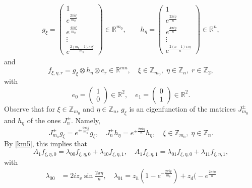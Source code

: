 \documentclass[12pt,reqno]{amsart}
\numberwithin{equation}{section}
\newcommand{\R}{{\mathbb R}}
\newcommand{\Z}{{\mathbb Z}}
\newcommand{\la}{\lambda}
\begin{document}
\begin{appendix}
\begin{equation}
\begin{aligned}
g_{\xi}=
\begin{pmatrix}
1  \\
e^{\frac{2\pi i \xi}{m_0}} \\
e^{\frac{4\pi i \xi}{m_0}} \\
\vdots \\
e^{\frac{2(m_0-1)\pi i \xi}{m_0}} 
\end{pmatrix}\in\R^{m_0},\qquad
h_{\eta}=
\begin{pmatrix}
1  \\
e^{\frac{2\pi i \eta}{n}} \\
e^{\frac{4\pi i \eta}{n}} \\
\vdots \\
e^{\frac{2(n-1)\pi i \eta}{n}} 
\end{pmatrix}\in\R^n,
\end{aligned}
\end{equation}
and
\begin{equation}\label{km7}
f_{\xi,\eta,r}=g_{\xi}\otimes h_{\eta}\otimes e_r\in \R^{mn},\quad \xi\in\Z_{m_0},\; \eta\in\Z_n,\; r\in \Z_2,
\end{equation}
with
\begin{equation}\label{km8}
e_0=\begin{pmatrix}1\\ 0\end{pmatrix}\in \R^2,\quad e_1=\begin{pmatrix}0\\ 1\end{pmatrix}\in\R^2.
\end{equation}
Observe that for $\xi\in\Z_{m_0}$ and $\eta\in\Z_n$, $g_{\xi}$ is an eigenfunction of the matrices 
$J_{m_0}^{\pm}$ and $h_{\eta}$ of the ones $J_n^{\pm}$. Namely, 
\begin{equation}\label{km9}
J_{m_0}^{\pm}g_{\xi}=e^{\pm\frac{2\pi i\xi}{m_0}}g_{\xi},\quad
J_{n}^{\pm}h_{\eta}=e^{\pm\frac{2\pi i\eta}{n}}h_{\eta},\quad \xi\in\Z_{m_0},\; \eta\in\Z_n.
\end{equation}
By \eqref{km5}, this implies that
\begin{equation}\label{km10}
A_1 f_{\xi,\eta,0}=\la_{00}f_{\xi,\eta,0}+\la_{10}f_{\xi,\eta,1},\quad
A_1 f_{\xi,\eta,1}=\la_{01}f_{\xi,\eta,0}+\la_{11}f_{\xi,\eta,1},
\end{equation}
with
\begin{equation}\label{km11}
\begin{aligned}
\la_{00}&=2iz_v\sin\frac{2\pi \eta}{n},\quad 
\la_{01}=z_h(1-e^{-\frac{2\pi i\xi}{m_0}})+z_d\big(-e^{\frac{2\pi i\eta}{n}}

\end{aligned}
\end{equation}
\end{appendix}
\end{document}
